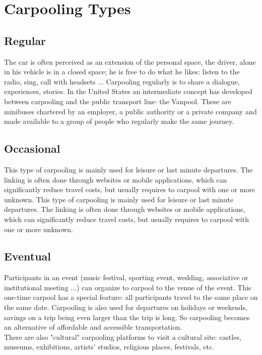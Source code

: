 \section{Carpooling Types}
\subsection{Regular}
The car is often perceived as an extension of the personal space, the driver, alone in 
his vehicle is in a closed space; he is free to do what he likes: listen to the radio, sing, call 
with headsets ... Carpooling regularly is to share a dialogue, experiences, stories.
In the United States an intermediate concept has developed between carpooling and 
the public transport line: the Vanpool. These are minibuses chartered by an employer, a 
public authority or a private company and made available to a group of people who 
regularly make the same journey.

\subsection{Occasional}
This type of carpooling is mainly used for leisure or last minute departures. The 
linking is often done through websites or mobile applications, which can significantly 
reduce travel costs, but usually requires to carpool with one or more unknown.
This type of carpooling is mainly used for leisure or last minute departures. The 
linking is often done through websites or mobile applications, which can significantly 
reduce travel costs, but usually requires to carpool with one or more unknown.

\subsection{Eventual}
Participants in an event (music festival, sporting event, wedding, associative or 
institutional meeting ...) can organize to carpool to the venue of the event. This one-time 
carpool has a special feature: all participants travel to the same place on the same date.
Carpooling is also used for departures on holidays or weekends, savings on a trip 
being even larger than the trip is long. So carpooling becomes an alternative of affordable 
and accessible transportation.
\\ There are also "cultural" carpooling platforms to visit a cultural site: castles, 
museums, exhibitions, artists' studios, religious places, festivals, etc.
